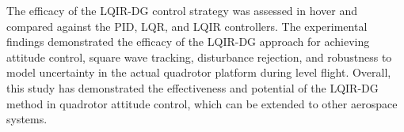 \documentclass[3p,times]{elsarticle}
\begin{document}
The efficacy of the LQIR-DG control strategy was assessed in hover and compared against the PID, LQR, and LQIR controllers. The experimental findings demonstrated the efficacy of the LQIR-DG approach for achieving attitude control, square wave tracking, disturbance rejection, and robustness to model uncertainty in the actual quadrotor platform during level flight. Overall, this study has demonstrated the effectiveness and potential of the LQIR-DG method in quadrotor attitude control, which can be extended to other aerospace systems.

















\end{document}
